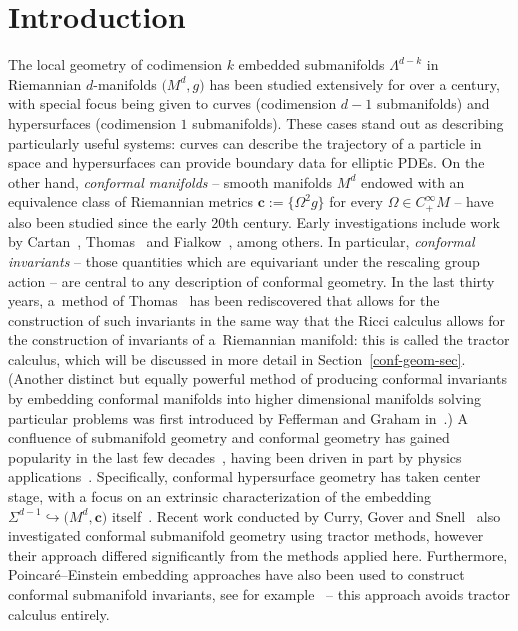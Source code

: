 \documentclass[pdftex]{sigma}
\numberwithin{equation}{section}
\newcommand{\cc}{\boldsymbol{c}}
\renewcommand{\=}{\stackrel \Lambda =}
\begin{document}
\section{Introduction}
The local geometry of codimension $k$ embedded submanifolds $\Lambda^{d-k}$ in Riemannian $d$-manifolds $\bigl(M^d,g\bigr)$ has been studied extensively for over a century, with special focus being given to curves (codimension $d-1$ submanifolds) and hypersurfaces (codimension $1$ submanifolds). These cases stand out as describing particularly useful systems: curves can describe the trajectory of a particle in space and hypersurfaces can provide boundary data for elliptic PDEs. On the other hand, \textit{conformal manifolds} -- smooth manifolds $M^d$ endowed with an equivalence class of Riemannian metrics $\cc := \big\{\Omega^2 g\big\}$ for every $\Omega \in C^\infty_+ M$ -- have also been studied since the early 20th century. Early investigations include work by Cartan~\cite{CartanConformal}, Thomas~\cite{ThomasConformal} and Fialkow~\cite{Fialkow}, among others. In particular, \textit{conformal invariants} -- those quantities which are equivariant under the rescaling group action -- are central to any description of conformal geometry. In the last thirty years, a~method of Thomas~\cite{BEG} has been rediscovered that allows for the construction of such invariants in the same way that the Ricci calculus allows for the construction of invariants of a~Riemannian manifold: this is called the tractor calculus, which will be discussed in more detail in Section~\ref{conf-geom-sec}. (Another distinct but equally powerful method of producing conformal invariants by embedding conformal manifolds into higher dimensional manifolds solving particular problems was first introduced by Fefferman and Graham in~\cite{FGbook}.) A confluence of submanifold geometry and conformal geometry has gained popularity in the last few decades~\cite{Forms,WillB,GR,GZscatt,MondinoNguyen,SZ2019,Chang}, having been driven in part by physics applications~\cite{HS, Maldacena}. Specifically, conformal hypersurface geometry has taken center stage, with a focus on an extrinsic characterization of the embedding $\Sigma^{d-1} \hookrightarrow \bigl(M^d,\cc\bigr)$ itself~\cite{Will2,Will1}. Recent work conducted by Curry, Gover and Snell~\cite{RodSnellCurry} also investigated conformal submanifold geometry using tractor methods, however their approach differed significantly from the methods applied here. Furthermore, Poincar\'e--Einstein embedding approaches have also been used to construct conformal submanifold invariants, see for example~\cite{CGKTW} -- this approach avoids tractor calculus entirely.
\end{document}
